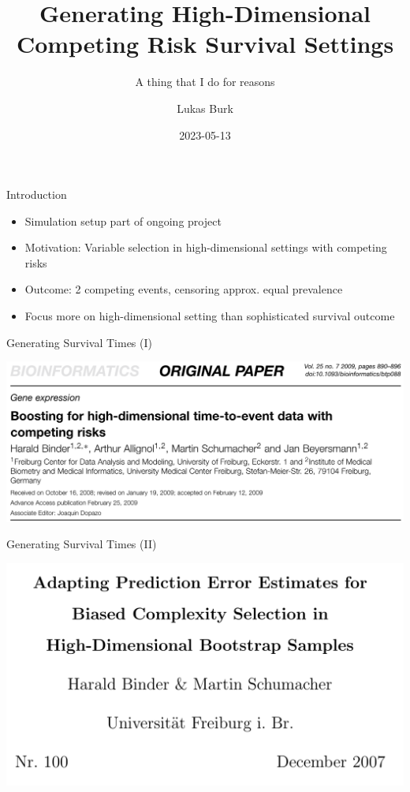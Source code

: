 \documentclass{beamer}
\title{Generating High-Dimensional Competing Risk Survival Settings}
\subtitle{A thing that I do for reasons}
\author{Lukas Burk}
\date{2023-05-13}
\providecommand{\tightlist}{%
  \setlength{\itemsep}{0pt}\setlength{\parskip}{0pt}}
\begin{document}
\frame{\maketitle}

\begin{frame}{Introduction}
\protect\hypertarget{introduction}{}
\begin{itemize}
\tightlist
\item
  Simulation setup part of ongoing project
\item
  Motivation: Variable selection in high-dimensional settings with
  competing risks
\item
  Outcome: 2 competing events, censoring approx. equal prevalence
\item
  Focus more on high-dimensional setting than sophisticated survival
  outcome
\end{itemize}
\end{frame}

\begin{frame}{Generating Survival Times (I)}
\protect\hypertarget{generating-survival-times-i}{}
\textcite{binder2009boostinghighdimensional}

\includegraphics[width=0.95\linewidth]{img/binder2009}
\end{frame}

\begin{frame}{Generating Survival Times (II)}
\protect\hypertarget{generating-survival-times-ii}{}
\textcite{binder2008adaptingprediction}

\includegraphics[width=0.95\linewidth]{img/binder2007}
\end{frame}
\end{document}
